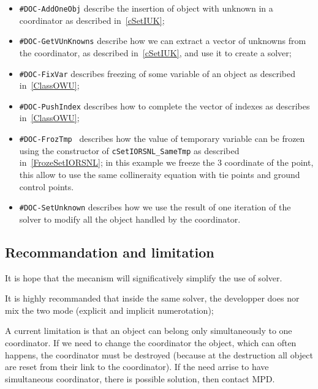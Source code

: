 \begin{itemize}
    \item  {\tt  \#DOC-AddOneObj} describe the insertion of object with unknown in a coordinator
           as described in~\ref{cSetIUK};

    \item  {\tt  \#DOC-GetVUnKnowns} describe how we can extract a vector of unknowns
           from the coordinator, as described in~\ref{cSetIUK}, and use it to create a solver;

    \item {\tt   \#DOC-FixVar} describes freezing of some variable of an object as described in~\ref{ClassOWU};

    \item {\tt  \#DOC-PushIndex} describes how to complete the vector of indexes as describes in~\ref{ClassOWU};

    \item {\tt \#DOC-FrozTmp } describes how the value of temporary variable can be frozen using the
          constructor of {\tt cSetIORSNL\_SameTmp} as described in~\ref{FrozeSetIORSNL};
          in this example we freeze the $3$ coordinate of the point, this allow to use the same
          collineraity equation with tie points and ground control points.

    \item {\tt  \#DOC-SetUnknown} describes how we use the result of one iteration of the solver
          to modify all the object handled by the coordinator.

\end{itemize}

\subsection{Recommandation and limitation}

It is hope that the mecanism will significatively simplify the use of solver.

It is highly recommanded that inside the same solver, the developper does nor mix the two
mode (explicit and implicit numerotation);

A current limitation is that an object can belong only simultaneously to one coordinator.
If we need to change the coordinator the object, which can often happens, the coordinator 
must be destroyed (because at the destruction all object are reset from their link to the
coordinator). If the need arrise to have simultaneous  coordinator, there is possible solution,
then contact MPD.



